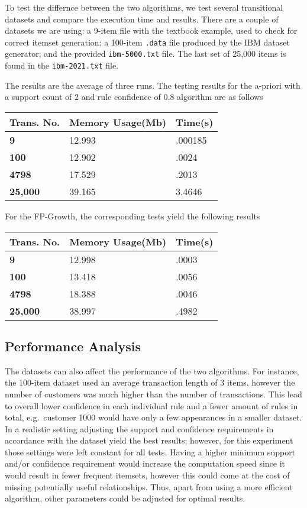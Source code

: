 \documentclass[
  paper=a4,
,captions=tableheading
]{scrartcl}
\newcommand{\passthrough}[1]{#1}
\begin{document}
To test the differnce between the two algorithms, we test several
transitional datasets and compare the execution time and results. There
are a couple of datasets we are using: a 9-item file with the textbook
example, used to check for correct itemset generation; a 100-item
\passthrough{\lstinline!.data!} file produced by the IBM dataset
generator; and the provided \passthrough{\lstinline!ibm-5000.txt!} file.
The last set of 25,000 items is found in the
\passthrough{\lstinline!ibm-2021.txt!} file.

The results are the average of three runs. The testing results for the
a-priori with a support count of 2 and rule confidence of 0.8 algorithm
are as follows

\begin{longtable}[]{@{}lll@{}}
\toprule
Trans. No. & Memory Usage(Mb) & Time(s) \\
\midrule
\endhead
\textbf{9} & 12.993 & .000185 \\
\textbf{100} & 12.902 & .0024 \\
\textbf{4798} & 17.529 & .2013 \\
\textbf{25,000} & 39.165 & 3.4646 \\
\bottomrule
\end{longtable}

For the FP-Growth, the corresponding tests yield the following results

\begin{longtable}[]{@{}lll@{}}
\toprule
Trans. No. & Memory Usage(Mb) & Time(s) \\
\midrule
\endhead
\textbf{9} & 12.998 & .0003 \\
\textbf{100} & 13.418 & .0056 \\
\textbf{4798} & 18.388 & .0046 \\
\textbf{25,000} & 38.997 & .4982 \\
\bottomrule
\end{longtable}

\hypertarget{performance-analysis}{%
\subsection{Performance Analysis}\label{performance-analysis}}

The datasets can also affect the performance of the two algorithms. For
instance, the 100-item dataset used an average transaction length of 3
items, however the number of customers was much higher than the number
of transactions. This lead to overall lower confidence in each
individual rule and a fewer amount of rules in total, e.g.~customer 1000
would have only a few appearances in a smaller dataset. In a realistic
setting adjusting the support and confidence requirements in accordance
with the dataset yield the best results; however, for this experiment
those settings were left constant for all tests. Having a higher minimum
support and/or confidence requirement would increase the computation
speed since it would result in fewer frequent itemsets, however this
could come at the cost of missing potentially useful relationships.
Thus, apart from using a more efficient algorithm, other parameters
could be adjusted for optimal results.
\end{document}
